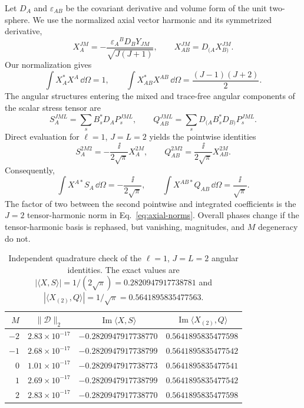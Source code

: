 Let $D_A$ and $\varepsilon_{AB}$ be the covariant derivative and volume form
of the unit two-sphere. We use the normalized axial vector harmonic and its
symmetrized derivative,
\begin{equation}
X_A^{JM}=-\frac{\varepsilon_A{}^{B}D_BY_{JM}}{\sqrt{J(J+1)}},
\qquad
X_{AB}^{JM}=D_{(A}X_{B)}^{JM}.
\label{eq:axial-harmonics}
\end{equation}
Our normalization gives
\begin{equation}
\int X_A^{*}X^A\,\dd\Omega=1,
\qquad
\int X_{AB}^{*}X^{AB}\,\dd\Omega
=\frac{(J-1)(J+2)}{2}.
\label{eq:axial-norms}
\end{equation}
The angular structures entering the mixed and trace-free angular components
of the scalar stress tensor are
\begin{equation}
S_A^{JML}=\sum_s B_s^{*}D_AP_s^{JML},
\qquad
Q_{AB}^{JML}=\sum_s D_{(A}B_s^{*}D_{B)}P_s^{JML}.
\label{eq:axial-bilinears}
\end{equation}
Direct evaluation for $\ell=1$, $J=L=2$ yields the pointwise identities
\begin{equation}
S_A^{2M2}=-\frac{\ii}{2\sqrt{\pi}}X_A^{2M},
\qquad
Q_{AB}^{2M2}=\frac{\ii}{2\sqrt{\pi}}X_{AB}^{2M}.
\label{eq:axial-pointwise}
\end{equation}
Consequently,
\begin{equation}
\int X^{A*}S_A\,\dd\Omega=-\frac{\ii}{2\sqrt{\pi}},
\qquad
\int X^{AB*}Q_{AB}\,\dd\Omega=\frac{\ii}{\sqrt{\pi}}.
\label{eq:axial-projections}
\end{equation}
The factor of two between the second pointwise and integrated coefficients is
the $J=2$ tensor-harmonic norm in Eq.~\eqref{eq:axial-norms}. Overall phases
change if the tensor-harmonic basis is rephased, but vanishing, magnitudes,
and $M$ degeneracy do not.

\begin{table}[t]
\centering
\caption{Independent quadrature check of the $\ell=1$, $J=L=2$ angular
identities. The exact values are
$|\langle X,S\rangle|=1/(2\sqrt\pi)=0.2820947917738781$ and
$|\langle X_{(2)},Q\rangle|=1/\sqrt\pi=0.5641895835477563$.}
\label{tab:axial-projection}
\small
\begin{tabular}{@{}rccc@{}}
\toprule
$M$ & $\|\mathcal D\|_2$ & $\operatorname{Im}\langle X,S\rangle$
& $\operatorname{Im}\langle X_{(2)},Q\rangle$ \\
\midrule
$-2$ & $2.83\times10^{-17}$ & $-0.2820947917738770$ & $0.5641895835477598$ \\
$-1$ & $2.68\times10^{-17}$ & $-0.2820947917738799$ & $0.5641895835477542$ \\
$0$  & $1.01\times10^{-17}$ & $-0.2820947917738773$ & $0.5641895835477541$ \\
$1$  & $2.69\times10^{-17}$ & $-0.2820947917738799$ & $0.5641895835477542$ \\
$2$  & $2.83\times10^{-17}$ & $-0.2820947917738770$ & $0.5641895835477598$ \\
\bottomrule
\end{tabular}
\end{table}


